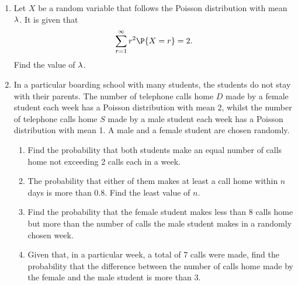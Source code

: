 \begin{problem}
    \begin{enumerate}
        \item Let $X$ be a random variable that follows the Poisson distribution with mean $\lambda$. It is given that \[\sum_{r = 1}^\infty r^2 \P{X = r} = 2.\] Find the value of $\lambda$.
        \item In a particular boarding school with many students, the students do not stay with their parents. The number of telephone calls home $D$ made by a female student each week has a Poisson distribution with mean 2, whilst the number of telephone calls home $S$ made by a male student each week has a Poisson distribution with mean 1. A male and a female student are chosen randomly.
        \begin{enumerate}
            \item Find the probability that both students make an equal number of calls home not exceeding 2 calls each in a week.
            \item The probability that either of them makes at least a call home within $n$ days is more than $0.8$. Find the least value of $n$.
            \item Find the probability that the female student makes less than 8 calls home but more than the number of calls the male student makes in a randomly chosen week.
            \item Given that, in a particular week, a total of 7 calls were made, find the probability that the difference between the number of calls home made by the female and the male student is more than 3.
        \end{enumerate}
    \end{enumerate}
\end{problem}
